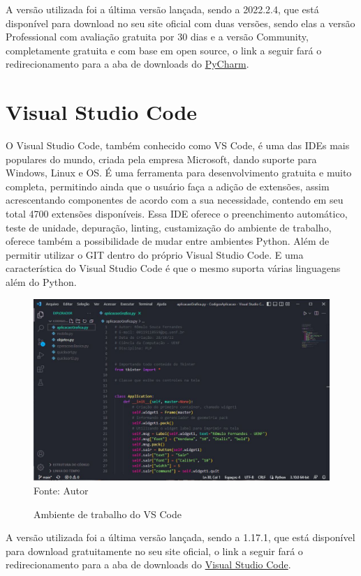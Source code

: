      A versão utilizada foi a última versão lançada, sendo a 2022.2.4, que está disponível para download no seu site oficial com duas versões, sendo elas a versão Professional com avaliação gratuita por 30 dias e a versão Community, completamente gratuita e com base em open source, o link a seguir fará o redirecionamento para a aba de downloads do \href{https://www.jetbrains.com/pt-br/pycharm/download/#section=windows}{PyCharm}.
    
    \section{Visual Studio Code}
	O Visual Studio Code, também conhecido como VS Code, é uma das IDEs mais populares do mundo, criada pela empresa Microsoft, dando suporte para Windows, Linux e OS. É uma ferramenta para desenvolvimento gratuita e muito completa, permitindo ainda que o usuário faça a adição de extensões, assim acrescentando componentes de acordo com a sua necessidade, contendo em seu total 4700 extensões disponíveis. Essa IDE oferece o preenchimento automático, teste de unidade, depuração, linting, custamização do ambiente de trabalho, oferece também a possibilidade de mudar entre ambientes Python. Além de permitir utilizar o GIT dentro do próprio Visual Studio Code. E uma característica do Visual Studio Code é que o mesmo suporta várias linguagens além do Python.
    
    \begin{figure}[H]
    	\begin{center}
    		\caption{Ambiente de trabalho do VS Code} \label{ling1}
    		\includegraphics[width=15cm]{vscode.JPG} \\
    		{\tiny \sf Fonte:{ Autor}}
    	\end{center}
    \end{figure}
    
    A versão utilizada foi a última versão lançada, sendo a 1.17.1, que está disponível para download gratuitamente no seu site oficial, o link a seguir fará o redirecionamento para a aba de downloads do \href{https://code.visualstudio.com}{Visual Studio Code}.
    
     